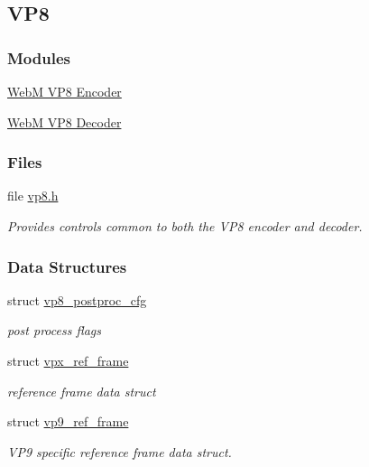\hypertarget{group__vp8}{\subsection{V\+P8}
\label{group__vp8}
}
\subsubsection*{Modules}
\begin{DoxyCompactItemize}
\item 
\hyperlink{group__vp8__encoder}{Web\+M V\+P8 Encoder}
\item 
\hyperlink{group__vp8__decoder}{Web\+M V\+P8 Decoder}
\end{DoxyCompactItemize}
\subsubsection*{Files}
\begin{DoxyCompactItemize}
\item 
file \hyperlink{vp8_8h}{vp8.\+h}
\begin{DoxyCompactList}\small\item\em Provides controls common to both the V\+P8 encoder and decoder. \end{DoxyCompactList}\end{DoxyCompactItemize}
\subsubsection*{Data Structures}
\begin{DoxyCompactItemize}
\item 
struct \hyperlink{structvp8__postproc__cfg}{vp8\+\_\+postproc\+\_\+cfg}
\begin{DoxyCompactList}\small\item\em post process flags \end{DoxyCompactList}\item 
struct \hyperlink{structvpx__ref__frame}{vpx\+\_\+ref\+\_\+frame}
\begin{DoxyCompactList}\small\item\em reference frame data struct \end{DoxyCompactList}\item 
struct \hyperlink{structvp9__ref__frame}{vp9\+\_\+ref\+\_\+frame}
\begin{DoxyCompactList}\small\item\em V\+P9 specific reference frame data struct. \end{DoxyCompactList}\end{DoxyCompactItemize}
